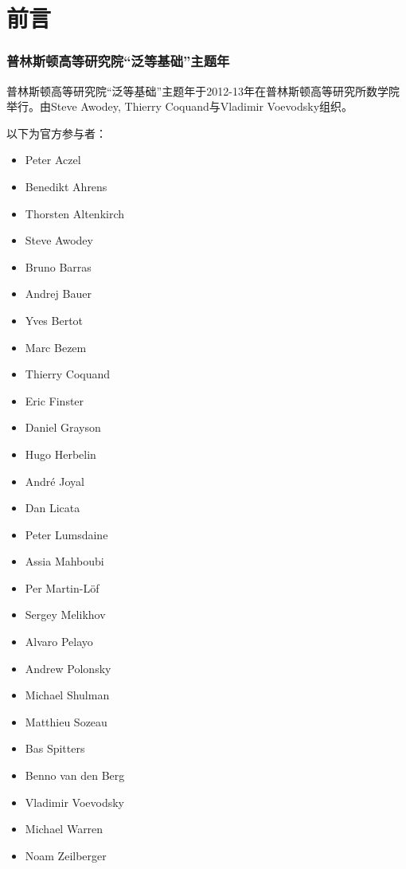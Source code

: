 \chapter*{前言}
\label{cha:preface}

\subsection*{普林斯顿高等研究院“泛等基础”主题年}

普林斯顿高等研究院“泛等基础”主题年于2012-13年在普林斯顿高等研究所数学院举行。由Steve Awodey, Thierry Coquand与Vladimir Voevodsky组织。

以下为官方参与者：

\begin{multicols}{\OPTprefacecols}{
\begin{itemize}
\item[] Peter Aczel
\item[] Benedikt Ahrens
\item[] Thorsten Altenkirch
\item[] Steve Awodey
\item[] Bruno Barras
\item[] Andrej Bauer
\item[] Yves Bertot
\item[] Marc Bezem
\item[] Thierry Coquand
\item[] Eric Finster
\item[] Daniel Grayson
\item[] Hugo Herbelin
\item[] Andr\'e Joyal
\item[] Dan Licata
\item[] Peter Lumsdaine
\item[] Assia Mahboubi
\item[] Per Martin-L\"of
\item[] Sergey Melikhov
\item[] Alvaro Pelayo
\item[] Andrew Polonsky
\item[] Michael Shulman
\item[] Matthieu Sozeau
\item[] Bas Spitters
\item[] Benno van den Berg
\item[] Vladimir Voevodsky
\item[] Michael Warren
\item[] Noam Zeilberger
\end{itemize}
}
\end{multicols}

